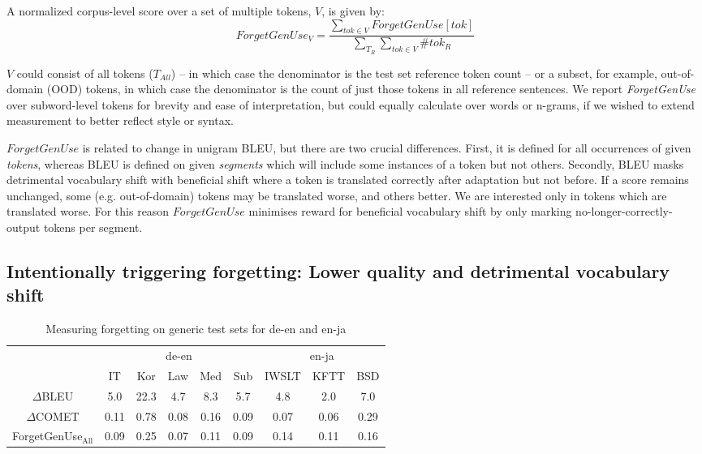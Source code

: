 \documentclass[11pt]{article}
\begin{document}
A normalized corpus-level score over a set of multiple tokens, $V$,  is given by:
\begin{equation}
ForgetGenUse_{V} = \frac{\sum\limits_{tok \in V}  ForgetGenUse[tok]}{\sum\limits_{T_R} \sum\limits_{tok \in V} \#tok_R}
\label{eq:forget}
\end{equation}
 
$V$ could consist of all tokens ($T_{All}$) -- in which case the denominator is the test set reference token count -- or a subset, for example, out-of-domain (OOD) tokens, in which case the denominator is the count of just those tokens in all reference sentences. We report \emph{ForgetGenUse} over subword-level tokens for brevity and ease of interpretation, but could equally calculate over words or n-grams, if we wished to extend measurement to better reflect style or syntax. %

$ForgetGenUse$ is related to change in unigram BLEU, but there are two crucial differences. First, it is defined for all occurrences of given \emph{tokens}, whereas BLEU is defined on given \emph{segments} which will include some instances of a  token but not others. Secondly, BLEU masks detrimental vocabulary shift with beneficial shift where a token is translated correctly after adaptation but not before. If a score remains unchanged, some (e.g. out-of-domain) tokens may be translated worse, and others better. We are interested only in tokens which are translated worse. For this reason $ForgetGenUse$ minimises reward for beneficial vocabulary shift by only marking no-longer-correctly-output tokens per segment.


\subsection{Intentionally triggering forgetting: Lower quality and detrimental vocabulary shift}
\label{sec-baselines}


\begin{table*}[t]
    \centering
   \small 
    \begin{tabular}{c| ccccc|ccc|}
                   &  \multicolumn{5}{c|}{de-en} &  \multicolumn{3}{c|}{en-ja}\\
         &  IT & Kor  &Law  &Med  & Sub &  IWSLT & KFTT & BSD  \\
         \hline
        $\Delta$BLEU & 5.0 &22.3  & 4.7  & 8.3 & 5.7  &4.8 & 2.0 & 7.0 \\
        $\Delta$COMET & 0.11 & 0.78 & 0.08 & 0.16 & 0.09 &  0.07 &0.06 & 0.29 \\
        ForgetGenUse$_{\text{All}}$ &  0.09 & 0.25  & 0.07  & 0.11  & 0.09 &  0.14  &0.11 & 0.16 \\
    \end{tabular}
    \caption{Measuring forgetting on generic test sets for de-en and en-ja}
    \label{tab:forgetting-metrics}
\end{table*}
\end{document}
